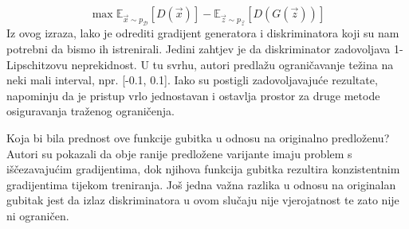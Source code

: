 \begin{equation}
\max \mathbb{E}_{\vec{x} \sim p_{\mathcal{D}}} \left[D(\vec{x})\right] - \mathbb{E}_{\vec{z} \sim p_{\vec{z}}}\left[D(G(\vec{z}))\right]
\end{equation}
Iz ovog izraza, lako je odrediti gradijent generatora i diskriminatora koji su nam potrebni da bismo ih istrenirali. Jedini zahtjev je da diskriminator zadovoljava 1-Lipschitzovu neprekidnost. U tu svrhu, autori predlažu ograničavanje težina na neki mali interval, npr. [-0.1, 0.1]. Iako su postigli zadovoljavajuće rezultate, napominju da je pristup vrlo jednostavan i ostavlja prostor za druge metode osiguravanja traženog ograničenja.

Koja bi bila prednost ove funkcije gubitka u odnosu na originalno predloženu? Autori su pokazali da obje ranije predložene varijante imaju problem s iščezavajućim gradijentima, dok njihova funkcija gubitka rezultira konzistentnim gradijentima tijekom treniranja. Još jedna važna razlika u odnosu na originalan gubitak jest da izlaz diskriminatora u ovom slučaju nije vjerojatnost te zato nije ni ograničen.

